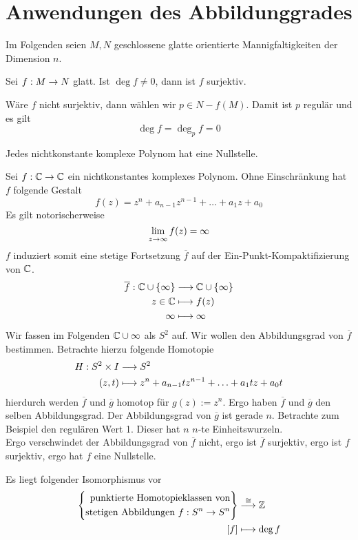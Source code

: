 \section{Anwendungen des Abbildunggrades}
Im Folgenden seien $M,N$ geschlossene glatte orientierte Mannigfaltigkeiten der Dimension $n$.

\Lem{}
Sei $f : M \overset{}{\rightarrow} N$ glatt. Ist $\deg f \neq 0$, dann ist $f$ surjektiv.
\begin{Beweis}{}
	Wäre $f$ nicht surjektiv, dann wählen wir $p\in N - f(M)$. Damit ist $p$ regulär und es gilt
	\[ \deg f = \deg_p f = 0 \]
\end{Beweis}

Jedes nichtkonstante komplexe Polynom hat eine Nullstelle.
\begin{Beweis}{}
Sei $f : \mathbb{C} \overset{}{\rightarrow} \mathbb{C}$ ein nichtkonstantes komplexes Polynom. Ohne Einschränkung hat $f$ folgende Gestalt
\[ f(z) = z^n + a_{n-1} z^{n-1}+\ldots + a_1z + a_0 \]
Es gilt notorischerweise
\[ \lim\limits_{z\overset{}{\rightarrow} \infty} f(z) = \infty \]
$f$ induziert somit eine stetige Fortsetzung $\overline{f}$ auf der Ein-Punkt-Kompaktifizierung von $\mathbb{C}$.
\begin{align*}
\overline{f} : \mathbb{C} \cup \{\infty\} & \overset{}{\longrightarrow}\mathbb{C} \cup \{\infty\}\\
z \in \mathbb{C} & \longmapsto f(z)\\
\infty & \longmapsto \infty
\end{align*}
Wir fassen im Folgenden $\mathbb{C} \cup \infty$ als $S^2$ auf. Wir wollen den Abbildungsgrad von $\overline{f}$ bestimmen. Betrachte hierzu folgende Homotopie
\begin{align*}
H : S^2 \times I & \overset{}{\longrightarrow} S^2\\
(z,t) & \longmapsto z^n + a_{n-1}tz^{n-1} + \ldots + a_1tz + a_0t
\end{align*}
hierdurch werden $\overline{f}$ und $\overline{g}$ homotop für $g(z) := z^n$. Ergo haben $\overline{f}$ und $\overline{g}$ den selben Abbildungsgrad. Der Abbildungsgrad von $\overline{g}$ ist gerade $n$. Betrachte zum Beispiel den regulären Wert 1. Dieser hat $n$ $n$-te Einheitswurzeln.\\
Ergo verschwindet der Abbildungsgrad von $\overline{f}$ nicht, ergo ist $\overline{f}$ surjektiv, ergo ist $f$ surjektiv, ergo hat $f$ eine Nullstelle.
\end{Beweis}

\Bem{}
Es liegt folgender Isomorphismus vor
\begin{align*}
\left\lbrace
\begin{aligned}
\text{punktierte Homotopieklassen von}\\
\text{stetigen Abbildungen }f : S^n \overset{}{\rightarrow} S^n
\end{aligned}
\right\rbrace
&\overset{\overset{}{\cong}}{\longrightarrow}
\mathbb{Z}\\
[f] & \longmapsto \deg f
\end{align*}

